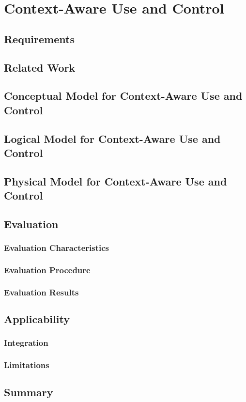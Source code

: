 \chapter{Context-Aware Use and Control}
\label{chap:componentDelegation}

\section{Requirements}

\section{Related Work}


\section{Conceptual Model for Context-Aware Use and Control}

\section{Logical Model for Context-Aware Use and Control}

\section{Physical Model for Context-Aware Use and Control}

\section{Evaluation}


\subsection{Evaluation Characteristics}
\subsection{Evaluation Procedure}
\subsection{Evaluation Results}


\section{Applicability}

\subsection{Integration}

\subsection{Limitations}

\section{Summary}